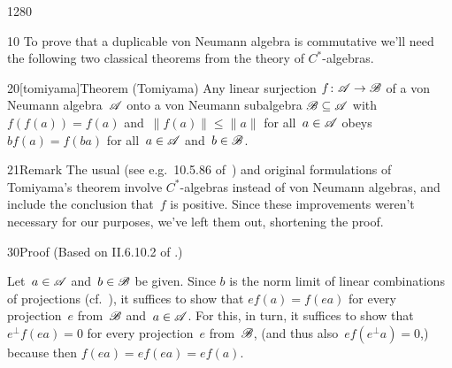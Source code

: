 \begin{parsec}{1280}%
\begin{point}{10}%
To prove that a duplicable von Neumann 
algebra is commutative we'll need the following two classical theorems
from the theory of $C^*$-algebras.
\end{point}
\begin{point}{20}[tomiyama]{Theorem (Tomiyama)}%
Any linear surjection
 $f\colon \mathscr{A}\to\mathscr{B}$
of a von Neumann algebra~$\mathscr{A}$ onto a von Neumann subalgebra 
$\mathscr{B}\subseteq \mathscr{A}$
with~$f(f(a))=f(a)$ and~$\|f(a)\|\leq\|a\|$ 
for all~$a\in \mathscr{A}$
obeys~$bf(a)=f(ba)$
for all~$a\in\mathscr{A}$ and~$b\in\mathscr{B}$.
\begin{point}{21}{Remark}%
The usual (see e.g.~10.5.86 of~\cite{kr}) 
and original\cite{tomiyama} formulations of Tomiyama's theorem
involve $C^*$-algebras instead of von Neumann algebras,
and include the conclusion that~$f$ is positive.
Since these improvements
weren't necessary for our purposes,
we've left them out, shortening the proof.
\end{point}
\begin{point}{30}{Proof}%
(Based on II.6.10.2 of \cite{blackadar2006operator}.)

Let~$a\in\mathscr{A}$ and~$b\in\mathscr{B}$ be given.
Since $b$ is the
norm limit of linear combinations of projections
(cf.~),
it suffices to show that $ef(a)=f(ea)$
for every projection~$e$ from~$\mathscr{B}$ and~$a\in \mathscr{A}$.
For this, in turn,
it suffices to show that $e^\perp f(ea)=0$
for every projection~$e$ from~$\mathscr{B}$,
(and thus also~$ef(e^\perp a)=0$,)
because then $f(ea)=ef(ea)=ef(a)$.


\end{point}
\end{point}
\end{parsec}
